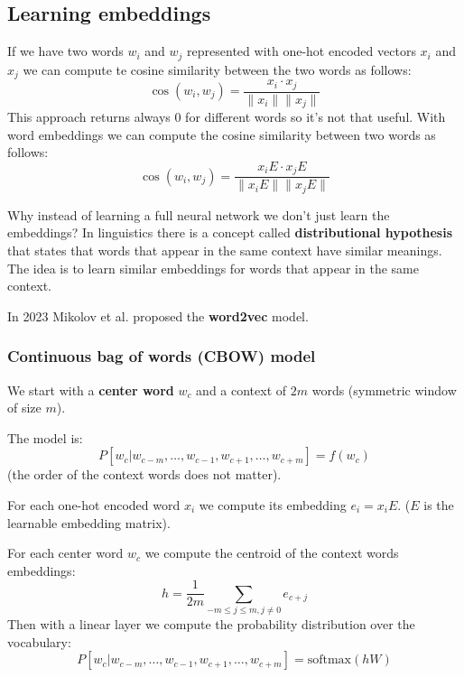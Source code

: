 \subsection{Learning embeddings}
\label{sec:learning_embeddings}

If we have two words $w_i$ and $w_j$ represented with one-hot encoded vectors $x_i$ and $x_j$ we can
compute te cosine similarity between the two words as follows:
\[
    \cos(w_i,w_j)=\frac{x_i\cdot x_j}{\|x_i\|\|x_j\|}
\]
This approach returns always 0 for different words so it's not that useful.
With word embeddings we can compute the cosine similarity between two words as follows:
\[
    \cos(w_i,w_j)=\frac{x_iE\cdot x_jE}{\|x_iE\|\|x_jE\|}
\]

Why instead of learning a full neural network we don't just learn the embeddings?
In linguistics there is a concept called \textbf{distributional hypothesis} that states
that words that appear in the same context have similar meanings.
The idea is to learn similar embeddings for words that appear in the same context.

In 2023 Mikolov et al. proposed the \textbf{word2vec} model.

\subsubsection{Continuous bag of words (CBOW) model}

We start with a \textbf{center word} $w_c$ and a context of $2m$ words (symmetric window of size $m$).

The model is:
\[
    P[w_c|w_{c-m},\dots,w_{c-1},w_{c+1},\dots,w_{c+m}]=f(w_c)
\]
(the order of the context words does not matter).

For each one-hot encoded word $x_i$ we compute its embedding $e_i=x_iE$. ($E$ is the learnable embedding matrix).

For each center word $w_c$ we compute the centroid of the context words embeddings:
\[
    h=\frac{1}{2m}\sum_{-m\leq j\leq m,j\neq 0}e_{c+j}
\]
Then with a linear layer we compute the probability distribution over the vocabulary:
\[
    P[w_c|w_{c-m},\dots,w_{c-1},w_{c+1},\dots,w_{c+m}]=\text{softmax}(hW)
\]

